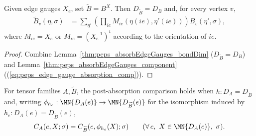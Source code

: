 \begin{lemma}%
    \label{thm:peps_edge_gauge_absorption}
    \leanok
    Given edge gauges $X_e$, set $\widetilde B=B^X$. Then
    $D_{\widetilde B}=D_B$ and, for every vertex $v$,
    \begin{align}
        \widetilde B_v(\eta,\sigma)
         & =
        \sum_{\eta'}
        \left(\prod_{ie}M_{ie}(\eta(ie),\eta'(ie))\right)
        B_v(\eta',\sigma),
        \label{eq:peps_edge_gauge_absorption_comp}
    \end{align}
    where $M_{ie}=X_e$ or $M_{ie}=(X_e^{-1})^t$ according to the orientation of
    $ie$.
\end{lemma}
\begin{proof}\leanok
    Combine Lemma~\ref{thm:peps_absorbEdgeGauges_bondDim} ($D_{\widetilde B}=D_B$)
    and Lemma~\ref{thm:peps_absorbEdgeGauges_component}
    ((\ref{eq:peps_edge_gauge_absorption_comp})).
\end{proof}

\begin{definition}%
    \label{def:peps_postAbsorptionEdgeInsertionEquality}
    \leanok
    For tensor families $A,\widetilde B$, the post-absorption comparison holds
    when $h:D_A=D_{\widetilde B}$ and, writing
    $\phi_{h_e}:\MN{D_A(e)}\to\MN{D_{\widetilde B}(e)}$ for the isomorphism
    induced by $h_e:D_A(e)=D_{\widetilde B}(e)$,
    \begin{align}
        C_A(e,X;\sigma) = C_{\widetilde B}(e,\phi_{h_e}(X);\sigma)
        \qquad (\forall\,e,\ X\in\MN{D_A(e)},\ \sigma).
        \label{eq:peps_post_absorption_insertion}
    \end{align}
\end{definition}

